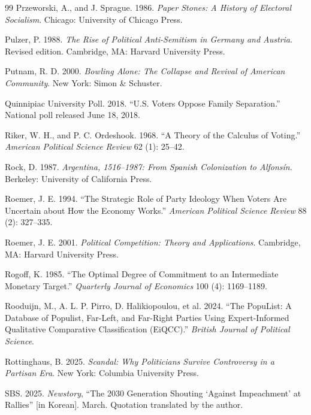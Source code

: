 \documentclass[12pt,letterpaper]{article}
\begin{document}
\begin{thebibliography}{99}
Przeworski, A., and J. Sprague. 1986. \textit{Paper Stones: A History of Electoral Socialism}. Chicago: University of Chicago Press.

Pulzer, P. 1988. \textit{The Rise of Political Anti-Semitism in Germany and Austria}. Revised edition. Cambridge, MA: Harvard University Press.

Putnam, R. D. 2000. \textit{Bowling Alone: The Collapse and Revival of American Community}. New York: Simon \& Schuster.

Quinnipiac University Poll. 2018. ``U.S. Voters Oppose Family Separation.'' National poll released June 18, 2018.

Riker, W. H., and P. C. Ordeshook. 1968. ``A Theory of the Calculus of Voting.'' \textit{American Political Science Review} 62 (1): 25--42.

Rock, D. 1987. \textit{Argentina, 1516--1987: From Spanish Colonization to Alfons\'{i}n}. Berkeley: University of California Press.

Roemer, J. E. 1994. ``The Strategic Role of Party Ideology When Voters Are Uncertain about How the Economy Works.'' \textit{American Political Science Review} 88 (2): 327--335.

Roemer, J. E. 2001. \textit{Political Competition: Theory and Applications}. Cambridge, MA: Harvard University Press.

Rogoff, K. 1985. ``The Optimal Degree of Commitment to an Intermediate Monetary Target.'' \textit{Quarterly Journal of Economics} 100 (4): 1169--1189.

Rooduijn, M., A. L. P. Pirro, D. Halikiopoulou, et al. 2024. ``The PopuList: A Database of Populist, Far-Left, and Far-Right Parties Using Expert-Informed Qualitative Comparative Classification (EiQCC).'' \textit{British Journal of Political Science}.

Rottinghaus, B. 2025. \textit{Scandal: Why Politicians Survive Controversy in a Partisan Era}. New York: Columbia University Press.

SBS. 2025. \textit{Newstory}, ``The 2030 Generation Shouting `Against Impeachment' at Rallies'' [in Korean]. March. Quotation translated by the author.


\end{thebibliography}
\end{document}

